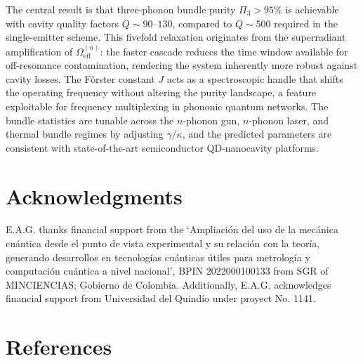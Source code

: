 \documentclass{ws-ijmpb}
\begin{document}
The central result is that three-phonon bundle purity $\Pi_3 > 95\%$ is achievable with 
cavity quality factors $Q \sim 90$--$130$, compared to $Q \sim 500$ required in the 
single-emitter scheme. This fivefold relaxation originates from the superradiant amplification 
of $\Omega_\mathrm{eff}^{(n)}$: the faster cascade reduces the time window available for 
off-resonance contamination, rendering the system inherently more robust against cavity losses. 
The F\"orster constant $J$ acts as a spectroscopic handle that shifts the operating frequency 
without altering the purity landscape, a feature exploitable for frequency multiplexing in 
phononic quantum networks. The bundle statistics are tunable across the $n$-phonon gun, 
$n$-phonon laser, and thermal bundle regimes by adjusting $\gamma/\kappa$, and the predicted 
parameters are consistent with state-of-the-art semiconductor QD-nanocavity platforms.


\section*{Acknowledgments}

E.A.G. thanks financial support from the ‘Ampliación del uso de la mecánica cuántica desde el punto de vista experimental y su relación con la teoría, generando desarrollos en tecnologías cuánticas útiles para metrología y computación cuántica a nivel nacional’, BPIN 2022000100133 from SGR of MINCIENCIAS; Gobierno de Colombia. Additionally, E.A.G. acknowledges financial support from Universidad del Quindío under proyect No. 1141.
%
%
\section*{References}
\end{document}
